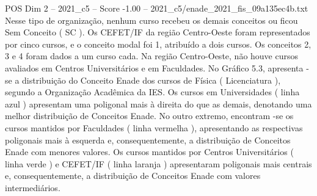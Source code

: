 \begin{textsample}{POS Dim 2 – 2021\_c5 – Score -1.00 – 2021\_c5/enade\_2021\_fis\_09a135ec4b.txt}
Nesse tipo de organização, nenhum curso recebeu os demais conceitos ou ficou Sem Conceito ( SC ).
Os CEFET/IF da região Centro-Oeste foram representados por cinco cursos, e o conceito modal foi 1, atribuído a dois cursos.
Os conceitos 2, 3 e 4 foram dados a um curso cada.
Na região Centro-Oeste, não houve cursos avaliados em Centros Universitários e em Faculdades.
No Gráfico 5.3, apresenta -se a distribuição do Conceito Enade dos cursos de Física ( Licenciatura ), segundo a Organização Acadêmica da IES.
Os cursos em Universidades ( linha azul ) apresentam uma poligonal mais à direita do que as demais, denotando uma melhor distribuição de Conceitos Enade.
No outro extremo, encontram -se os cursos mantidos por Faculdades ( linha vermelha ), apresentando as respectivas poligonais mais à esquerda e, consequentemente, a distribuição de Conceitos Enade com menores valores.
Os cursos mantidos por Centros Universitários ( linha verde ) e CEFET/IF ( linha laranja ) apresentaram poligonais mais centrais e, consequentemente, a distribuição de Conceitos Enade com valores intermediários.

\end{textsample}
